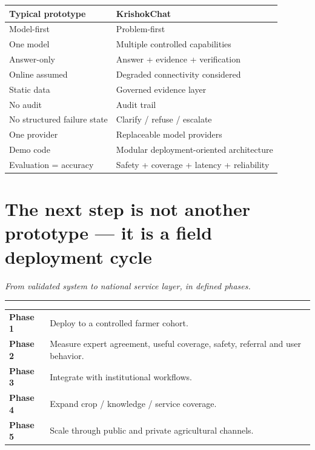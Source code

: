 \documentclass[11pt,a4paper]{article}
\newcommand{\takeaway}[1]{{\color{kcgrey}\itshape\large #1}\par\vspace{2pt}%
  {\color{kcline}\rule{\linewidth}{0.8pt}}\par\vspace{6pt}}
\begin{document}
\begin{center}
\begin{tabularx}{\linewidth}{XX}
\toprule
\textbf{Typical prototype} & \textbf{KrishokChat}\\
\midrule
Model-first & Problem-first\\
One model & Multiple controlled capabilities\\
Answer-only & Answer + evidence + verification\\
Online assumed & Degraded connectivity considered\\
Static data & Governed evidence layer\\
No audit & Audit trail\\
No structured failure state & Clarify / refuse / escalate\\
One provider & Replaceable model providers\\
Demo code & Modular deployment-oriented architecture\\
Evaluation = accuracy & Safety + coverage + latency + reliability\\
\bottomrule
\end{tabularx}
\end{center}

\newpage
\section*{\color{kcgreen}The next step is not another prototype --- it is a field deployment cycle}
\takeaway{From validated system to national service layer, in defined phases.}

\begin{center}
\end{center}

\begin{tabularx}{\linewidth}{lX}
\textbf{Phase 1} & Deploy to a controlled farmer cohort.\\
\textbf{Phase 2} & Measure expert agreement, useful coverage, safety, referral and user behavior.\\
\textbf{Phase 3} & Integrate with institutional workflows.\\
\textbf{Phase 4} & Expand crop / knowledge / service coverage.\\
\textbf{Phase 5} & Scale through public and private agricultural channels.\\
\end{tabularx}
\end{document}
